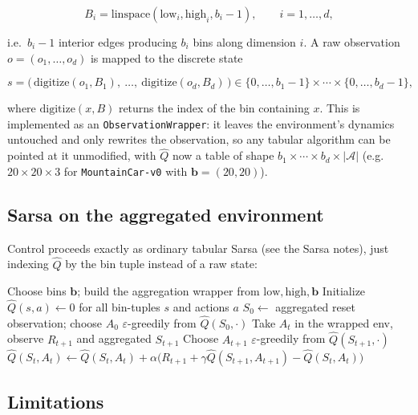 \documentclass[11pt]{article}
\begin{document}
\[
    B_i = \text{linspace}(\text{low}_i, \text{high}_i, b_i - 1), \qquad i = 1, \dots, d,
\]

i.e.\ $b_i - 1$ interior edges producing $b_i$ bins along dimension $i$.
A raw observation $o = (o_1, \dots, o_d)$ is mapped to the discrete state

\[
    s = \big(\, \mathrm{digitize}(o_1, B_1),\ \dots,\ \mathrm{digitize}(o_d, B_d) \,\big) \in \{0, \dots, b_1-1\} \times \cdots \times \{0, \dots, b_d-1\},
\]

where $\mathrm{digitize}(x, B)$ returns the index of the bin containing
$x$. This is implemented as an \texttt{ObservationWrapper}: it leaves the
environment's dynamics untouched and only rewrites the observation, so any
tabular algorithm can be pointed at it unmodified, with
$\hat{Q}$ now a table of shape $b_1 \times \cdots \times b_d \times
|\mathcal{A}|$ (e.g.\ $20 \times 20 \times 3$ for \texttt{MountainCar-v0}
with $\mathbf{b} = (20, 20)$).

\subsection{Sarsa on the aggregated environment}

Control proceeds exactly as ordinary tabular Sarsa (see the Sarsa notes),
just indexing $\hat{Q}$ by the bin tuple instead of a raw state:

\begin{algorithm}[h]
\caption{Sarsa with state aggregation}
\begin{algorithmic}[1]
\State Choose bins $\mathbf{b}$; build the aggregation wrapper from $\text{low}, \text{high}, \mathbf{b}$
\State Initialize $\hat{Q}(s,a) \leftarrow 0$ for all bin-tuples $s$ and actions $a$
    \State $S_0 \leftarrow$ aggregated reset observation; choose $A_0$ $\varepsilon$-greedily from $\hat{Q}(S_0, \cdot)$
        \State Take $A_t$ in the wrapped env, observe $R_{t+1}$ and aggregated $S_{t+1}$
        \State Choose $A_{t+1}$ $\varepsilon$-greedily from $\hat{Q}(S_{t+1}, \cdot)$
        \State $\hat{Q}(S_t, A_t) \leftarrow \hat{Q}(S_t, A_t) + \alpha \big( R_{t+1} + \gamma \hat{Q}(S_{t+1}, A_{t+1}) - \hat{Q}(S_t, A_t) \big)$
    \EndFor
\EndFor
\end{algorithmic}
\end{algorithm}

\subsection{Limitations}
\end{document}
